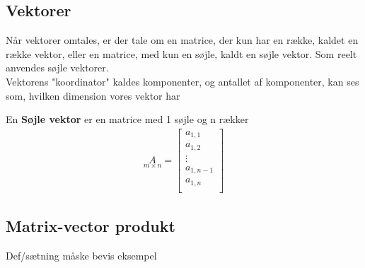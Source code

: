 \subsection{Vektorer}
Når vektorer omtales, er der tale om en matrice, der kun har en række, kaldet en række vektor, eller en matrice, med kun en søjle, kaldt en søjle vektor. Som reelt anvendes søjle vektorer. \\
Vektorens "koordinator" kaldes komponenter, og antallet af komponenter, kan ses som, hvilken dimension vores vektor har
\begin{defn}
En \textbf{Søjle vektor} er en matrice med 1 søjle og n rækker
\begin{align}
\underset{m \times n}{A} = 
\begin{bmatrix}
a_{1,1}\\
a_{1,2}\\
\vdots \\
a_{1,n-1} \\
a_{1,n} \\
\end{bmatrix}
\end{align} 
\end{defn}




\subsection{Matrix-vector produkt}

Def/sætning
måske bevis
eksempel
